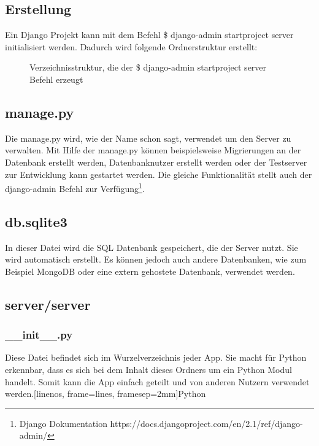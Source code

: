 \documentclass{article}
\begin{document}
\subsection{Erstellung}
Ein Django Projekt kann mit dem Befehl \$ django-admin startproject server initialisiert werden. Dadurch wird folgende Ordnerstruktur erstellt:
\begin{figure}[H]
\caption{Verzeichnisstruktur, die der \$ django-admin startproject server Befehl erzeugt}
\end{figure}
\subsection{manage.py}
Die manage.py wird, wie der Name schon sagt, verwendet um den Server zu verwalten. Mit Hilfe der manage.py können beispielsweise Migrierungen an der Datenbank erstellt werden, Datenbanknutzer erstellt werden oder der Testserver zur Entwicklung kann gestartet werden. Die gleiche Funktionalität stellt auch der django-admin Befehl zur Verfügung\footnote{Django Dokumentation https://docs.djangoproject.com/en/2.1/ref/django-admin/}.

\subsection{db.sqlite3}
In dieser Datei wird die SQL Datenbank gespeichert, die der Server nutzt. Sie wird automatisch erstellt. Es können jedoch auch andere Datenbanken, wie zum Beispiel MongoDB oder eine extern gehostete Datenbank, verwendet werden.

\subsection{server/server} 
\subsubsection{\_\_init\_\_.py}
Diese Datei befindet sich im Wurzelverzeichnis jeder App. Sie macht für Python erkennbar, dass es sich bei dem Inhalt dieses Ordners um ein Python Modul handelt. Somit kann die App einfach geteilt und von anderen Nutzern verwendet werden.[linenos, frame=lines, framesep=2mm]{Python}
\end{document}
